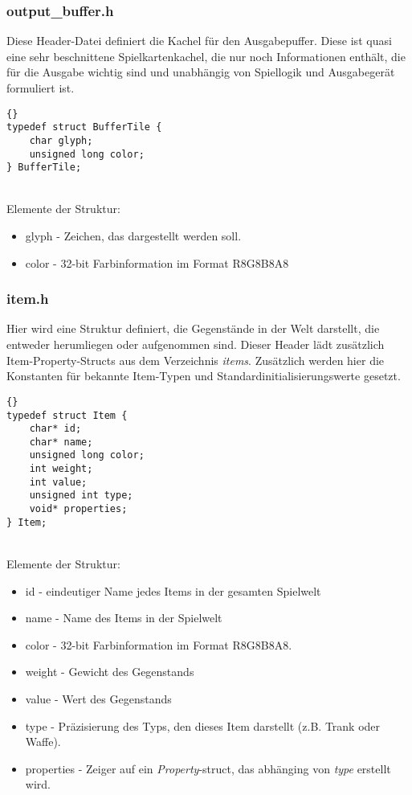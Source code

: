 \documentclass[11pt,a4paper,notitlepage]{report}
\begin{document}
	\newpage
	\subsubsection*{output\_buffer.h}
	Diese Header-Datei definiert die Kachel für den Ausgabepuffer. Diese ist quasi eine sehr beschnittene Spielkartenkachel, die nur noch Informationen enthält, die für die Ausgabe wichtig sind und unabhängig von Spiellogik und Ausgabegerät formuliert ist.
	
		\begin{lstlisting}[caption=BufferTile]{}
typedef struct BufferTile {
	char glyph;
	unsigned long color;
} BufferTile;
		\end{lstlisting} \hspace*{\fill} \\
Elemente der Struktur:
		\begin{itemize}
			\item glyph - Zeichen, das dargestellt werden soll.
			\item color - 32-bit Farbinformation im Format R8G8B8A8
		\end{itemize}
	
	\newpage
	\subsubsection*{item.h}
	Hier wird eine Struktur definiert, die Gegenstände in der Welt darstellt, die entweder herumliegen oder aufgenommen sind. Dieser Header lädt zusätzlich Item-Property-Structs aus dem Verzeichnis \textit{items}. Zusätzlich werden hier die Konstanten für bekannte Item-Typen und Standardinitialisierungswerte gesetzt.
	
	\begin{lstlisting}[caption=Item]{}
typedef struct Item {
	char* id;
	char* name;
	unsigned long color;
	int weight;
	int value;
	unsigned int type;
	void* properties;
} Item;
		\end{lstlisting} \hspace*{\fill} \\
Elemente der Struktur:
		\begin{itemize}
			\item id - eindeutiger Name jedes Items in der gesamten Spielwelt
			\item name - Name des Items in der Spielwelt
			\item color - 32-bit Farbinformation im Format R8G8B8A8.
			\item weight - Gewicht des Gegenstands
			\item value - Wert des Gegenstands
			\item type - Präzisierung des Typs, den dieses Item darstellt (z.B. Trank oder Waffe).
			\item properties - Zeiger auf ein \textit{Property}-struct, das abhänging von \textit{type} erstellt wird.
		\end{itemize}
		
\end{document}
